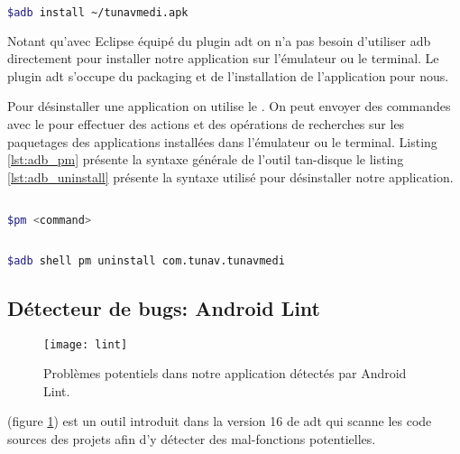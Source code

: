 \begin{lstlisting}[language=bash, label=lst:adb_install, caption=Exemple d'utilisation du commande adb install]

$adb install ~/tunavmedi.apk

\end{lstlisting}

Notant qu'avec Eclipse équipé du plugin \gls{adt} on n'a pas besoin d'utiliser
\gls{adb} directement pour installer notre application sur l'émulateur ou le
terminal. Le plugin \gls{adt} s'occupe du packaging et de l'installation de
l'application pour nous.


Pour désinstaller une application on utilise le . On peut
envoyer des commandes avec le  pour effectuer des actions et
des opérations de recherches sur les paquetages des applications installées dans
l'émulateur ou le terminal. Listing \ref{lst:adb_pm} présente la syntaxe
générale de l'outil tan-disque le listing \ref{lst:adb_uninstall} présente la
syntaxe utilisé pour désinstaller notre application.


\begin{lstlisting}[language=bash, label=lst:adb_pm, caption=Syntaxe générale de l'utilisation du Package Manager]

$pm <command>

\end{lstlisting}

\begin{lstlisting}[language=bash, label=lst:adb_uninstall, caption=Exemple de désinstallation]

$adb shell pm uninstall com.tunav.tunavmedi

\end{lstlisting}

\subsection{Détecteur de bugs: Android Lint}

\begin{figure}[H]
\center
\texttt{[image: lint]}
\caption{Problèmes potentiels dans notre application détectés par Android Lint.}
\label{fig:lint}
\end{figure}

\android{}  (figure \ref{fig:lint}) est un outil introduit dans la version 16 de \gls{adt} qui scanne les code sources des projets \android{} afin d'y détecter des mal-fonctions potentielles.


